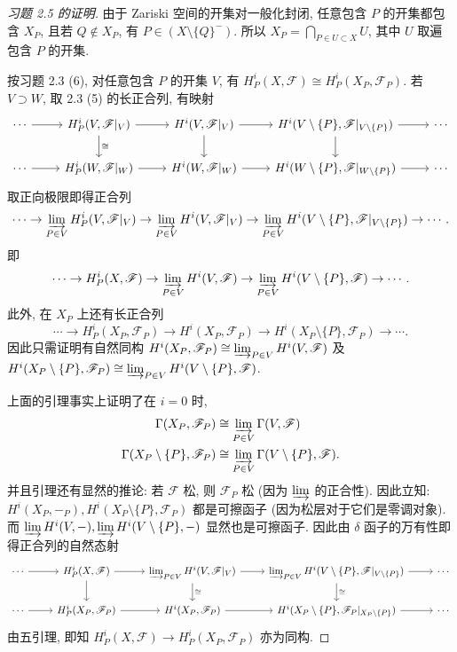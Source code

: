 \documentclass{article}
\theoremstyle{exercise}
\theoremstyle{theorem}
\theoremstyle{remark}
\def\cF{\mathscr{F}}
\begin{document}
\begin{proof}[习题 2.5 的证明]
  由于 Zariski 空间的开集对一般化封闭, 任意包含 $P$ 的开集都包含 $X_P$,
  且若 $Q \notin X_P$, 有 $P \in (X \setminus \{Q\}^-)$.
  所以 $X_P = \bigcap_{P \in U \subset X} U$, 其中 $U$ 取遍包含 $P$ 的开集.

  按习题 2.3 (6), 对任意包含 $P$ 的开集 $V$, 有 $H_P^i(X, \cF) \cong H_P^i(X_P, \cF_P)$.
  若 $V \supset W$, 取 2.3 (5) 的长正合列, 有映射
  \[
    \begin{tikzcd}
      \cdots \ar[r] & H_P^i(V, \cF|_V) \ar[r] \ar[d, "\cong"]
      & H^i(V, \cF|_V) \ar[r] \ar[d] & H^i(V \setminus \{P\}, \cF|_{V \setminus \{P\}}) \ar[r] \ar[d] & \cdots\\
      \cdots \ar[r] & H_P^i(W, \cF|_W) \ar[r]
      & H^i(W, \cF|_W) \ar[r] & H^i(W \setminus \{P\}, \cF|_{W \setminus \{P\}}) \ar[r] & \cdots
    \end{tikzcd}
  \]
  取正向极限即得正合列
  \[
    \cdots \to \varinjlim_{P \in V} H_P^i(V, \cF|_V)
    \to \varinjlim_{P \in V} H^i(V, \cF|_V)
    \to \varinjlim_{P \in V} H^i(V \setminus \{P\}, \cF|_{V \setminus \{P\}})
    \to \cdots.
  \]
  即
  \[
    \cdots \to H_P^i(X, \cF)
    \to \varinjlim_{P \in V} H^i(V, \cF)
    \to \varinjlim_{P \in V} H^i(V \setminus \{P\}, \cF)
    \to \cdots.
  \]
  此外, 在 $X_P$ 上还有长正合列
  \[
    \cdots \to H_P^i(X_P, \cF_P) \to H^i(X_P, \cF_P) \to H^i(X_P \setminus \{P\}, \cF_P) \to \cdots.
  \]
  因此只需证明有自然同构 $H^i(X_P, \cF_P) \cong \varinjlim_{P \in V} H^i(V, \cF)$
  及 $H^i(X_P \setminus \{P\}, \cF_P) \cong \varinjlim_{P \in V} H^i(V \setminus \{P\}, \cF)$.

  上面的引理事实上证明了在 $i = 0$ 时,
  \begin{align*}
    \Gamma(X_P, \cF_P) &\cong \varinjlim_{P \in V} \Gamma(V, \cF) \\
    \Gamma(X_P \setminus \{P\}, \cF_P) &\cong \varinjlim_{P \in V} \Gamma(V \setminus \{P\}, \cF).
  \end{align*}
  并且引理还有显然的推论: 若 $\cF$ 松, 则 $\cF_P$ 松 (因为 $\varinjlim$ 的正合性).
  因此立知: $H^i(X_P, -_P), H^i(X_P \setminus \{P\}, \cF_P)$ 都是可擦函子 (因为松层对于它们是零调对象).
  而 $\varinjlim H^i(V, -), \varinjlim H^i(V \setminus \{P\}, -)$ 显然也是可擦函子.
  因此由 $\delta$ 函子的万有性即得正合列的自然态射
  \[
    \begin{tikzcd}
      \cdots \ar[r] & H_P^i(X, \cF) \ar[r] \ar[d]
      & \varinjlim_{P \in V} H^i(V, \cF|_V) \ar[r] \ar[d, "\cong"]
      & \varinjlim_{P \in V} H^i(V \setminus \{P\}, \cF|_{V \setminus \{P\}}) \ar[r] \ar[d, "\cong"] & \cdots\\
      \cdots \ar[r] & H_P^i(X_P, \cF_P) \ar[r]
      & H^i(X_P, \cF_P) \ar[r] & H^i(X_P \setminus \{P\}, \cF_P|_{X_P \setminus \{P\}}) \ar[r] & \cdots
    \end{tikzcd}
  \]
  由五引理, 即知 $H_P^i(X, \cF) \to H_P^i(X_P, \cF_P)$ 亦为同构.
\end{proof}
\end{document}
